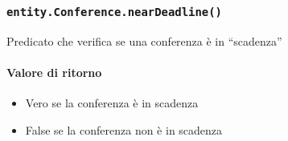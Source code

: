 \subsubsection{\texttt{entity.Conference.nearDeadline()}}
Predicato che verifica se una conferenza è in ``scadenza''
\paragraph{Valore di ritorno}
\begin{itemize}
\item Vero se la conferenza è in scadenza
\item False se la conferenza non  è in scadenza
\end{itemize}

